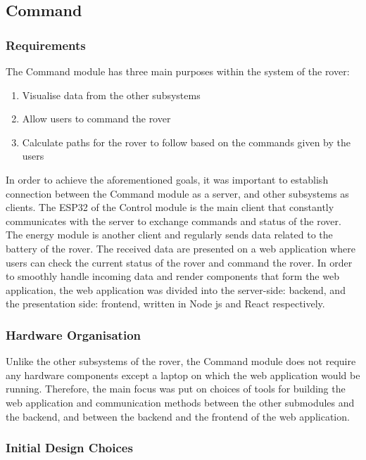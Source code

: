 \documentclass[a4paper]{article}
\begin{document}
\subsection{Command}

\subsubsection{Requirements}

The Command module has three main purposes within the system of the rover:

\begin{enumerate}
    \item Visualise data from the other subsystems
    \item Allow users to command the rover
    \item Calculate paths for the rover to follow based on the commands given by the users
\end{enumerate}

In order to achieve the aforementioned goals, it was important to establish 
connection between the Command module as a server, and other subsystems as 
clients. The ESP32 of the Control module is the main client that constantly 
communicates with the server to exchange commands and status of the rover. 
The energy module is another client and regularly sends data related to the 
battery of the rover. The received data are presented on a web application 
where users can check the current status of the rover and command the rover. 
In order to smoothly handle incoming data and render components that form the 
web application, the web application was divided into the server-side: backend, 
and the presentation side: frontend, written in Node js and React respectively.

\subsubsection{Hardware Organisation}

Unlike the other subsystems of the rover, the Command module does not require any 
hardware components except a laptop on which the web application would be running. 
Therefore, the main focus was put on choices of tools for building the web application 
and communication methods between the other submodules and the backend, and between the 
backend and the frontend of the web application. 

\subsubsection{Initial Design Choices}
\end{document}
